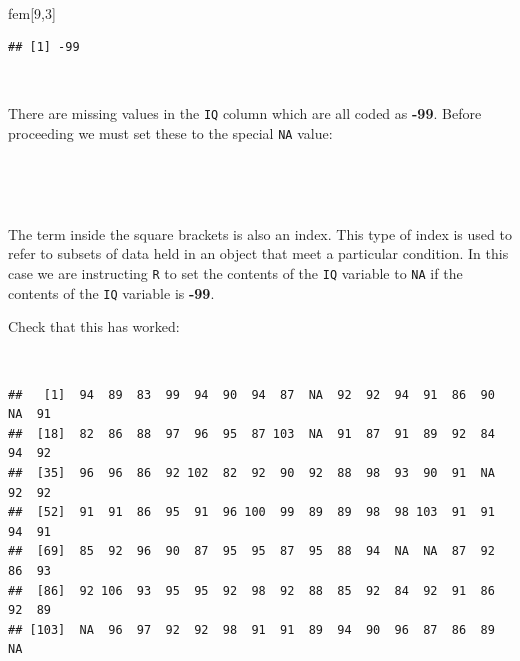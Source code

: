 \documentclass[12pt,a4paper]{book}
\newenvironment{Shaded}{\begin{snugshade}}{\end{snugshade}}
\newcommand{\DecValTok}[1]{\textcolor[rgb]{0.00,0.00,0.81}{#1}}
\newcommand{\StringTok}[1]{\textcolor[rgb]{0.31,0.60,0.02}{#1}}
\newcommand{\OtherTok}[1]{\textcolor[rgb]{0.56,0.35,0.01}{#1}}
\newcommand{\OperatorTok}[1]{\textcolor[rgb]{0.81,0.36,0.00}{\textbf{#1}}}
\newcommand{\NormalTok}[1]{#1}
\theoremstyle{definition}
\theoremstyle{definition}
\theoremstyle{definition}
\theoremstyle{remark}
\begin{document}
~

\begin{Shaded}
\begin{Highlighting}[]
\NormalTok{fem[}\DecValTok{9}\NormalTok{,}\DecValTok{3}\NormalTok{]}
\end{Highlighting}
\end{Shaded}

\begin{verbatim}
## [1] -99
\end{verbatim}

~

There are missing values in the \texttt{IQ} column which are all coded
as \textbf{-99}. Before proceeding we must set these to the special
\texttt{NA} value:

~

\begin{Shaded}
\end{Shaded}

~

The term inside the square brackets is also an index. This type of index
is used to refer to subsets of data held in an object that meet a
particular condition. In this case we are instructing \texttt{R} to set
the contents of the \texttt{IQ} variable to \texttt{NA} if the contents
of the \texttt{IQ} variable is \textbf{-99}.

\newpage

Check that this has worked:

~

\begin{Shaded}
\end{Shaded}

\begin{verbatim}
##   [1]  94  89  83  99  94  90  94  87  NA  92  92  94  91  86  90  NA  91
##  [18]  82  86  88  97  96  95  87 103  NA  91  87  91  89  92  84  94  92
##  [35]  96  96  86  92 102  82  92  90  92  88  98  93  90  91  NA  92  92
##  [52]  91  91  86  95  91  96 100  99  89  89  98  98 103  91  91  94  91
##  [69]  85  92  96  90  87  95  95  87  95  88  94  NA  NA  87  92  86  93
##  [86]  92 106  93  95  95  92  98  92  88  85  92  84  92  91  86  92  89
## [103]  NA  96  97  92  92  98  91  91  89  94  90  96  87  86  89  NA
\end{verbatim}
\end{document}
